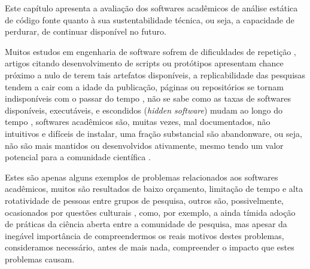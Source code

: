 {Este capítulo apresenta a avaliação dos softwares acadêmicos de análise
estática de código fonte quanto à sua sustentabilidade técnica, ou seja, a
capacidade de perdurar, de continuar disponível no futuro.}
\label{sustentabilidade-tecnica}


Muitos estudos em engenharia de software sofrem de dificuldades de repetição
\cite{Tang2016}, artigos citando desenvolvimento de scripts ou protótipos
apresentam chance próximo a nulo de terem tais artefatos disponíveis, a
replicabilidade das pesquisas tendem a cair com a idade da publicação, páginas
ou repositórios se tornam indisponíveis com o passar do tempo
\cite{robles2010replicating}, não se sabe como as taxas de softwares
disponíveis, executáveis, e escondidos ({\it hidden software}) mudam ao longo
do tempo \cite{allen2017engineering}, softwares acadêmicos são, muitas vezes, mal
documentados, não intuitivos e difíceis de instalar, uma fração substancial são
abandonware, ou seja, não são mais mantidos ou desenvolvidos ativamente, mesmo
tendo um valor potencial para a comunidade científica \cite{list2017ten}.

Estes são apenas alguns exemplos de problemas relacionados aos softwares
acadêmicos, muitos são resultados de baixo orçamento, limitação de tempo e alta
rotatividade de pessoas entre grupos de pesquisa, outros são, possivelmente,
ocasionados por questões culturais \cite{niemeyer2017open}, como, por exemplo,
a ainda tímida adoção de práticas da ciência aberta entre a comunidade de
pesquisa, mas apesar da inegável importância de compreendermos os reais motivos
destes problemas, consideramos necessário, antes de mais nada, compreender o
impacto que estes problemas causam.

